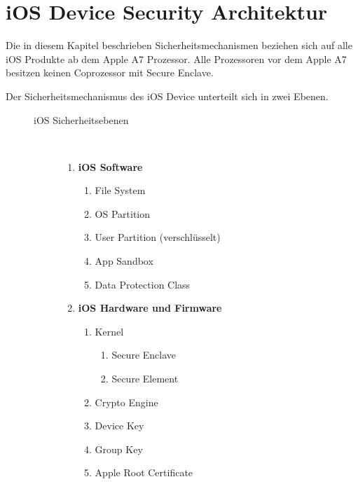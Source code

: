 \pagebreak
\section{iOS Device Security Architektur}
\label{sec:iOSSecArchitektur}

Die in diesem Kapitel beschrieben Sicherheitsmechanismen beziehen sich auf alle iOS Produkte ab dem Apple A7 Prozessor. Alle Prozessoren vor dem Apple A7 besitzen keinen Coprozessor mit Secure Enclave.\par
Der Sicherheitsmechanismus des iOS Device unterteilt sich in zwei Ebenen. 
\begin{figure}[htb]
  \begin{minipage}{0.6\textwidth} 
  		\begin{description}
   			\item[ iOS Sicherheitsebenen]~\par
         		\begin{enumerate}	
				\item  \textbf{iOS Software}
					\begin{enumerate}
       						\item File System
         					\item OS Partition
						\item User Partition (verschlüsselt)
						\item App Sandbox
						\item Data Protection Class
      					\end{enumerate}
      				\item  \textbf{iOS Hardware und Firmware}~\par
					\begin{enumerate}
       						\item Kernel
						\begin{enumerate}
						\item Secure Enclave
						\item Secure Element
         					\end{enumerate}	
						\item Crypto Engine
						\item Device Key
						\item Group Key
						\item Apple Root Certificate
      					\end{enumerate}
			\end{enumerate}
   		\end{description}

\end{minipage}
\end{figure}
